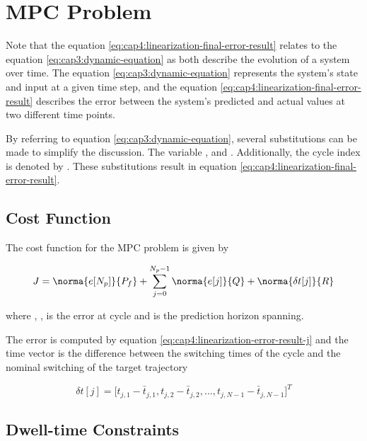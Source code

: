 \section{MPC Problem}

Note that the equation \eqref{eq:cap4:linearization-final-error-result} relates to the equation \eqref{eq:cap3:dynamic-equation} as both describe the evolution of a
system over time. The equation \eqref{eq:cap3:dynamic-equation} represents the system's state and input at a given time step,
and the equation \eqref{eq:cap4:linearization-final-error-result} describes the error between the system's predicted and actual values at two different time points.

By referring to equation \eqref{eq:cap3:dynamic-equation}, several substitutions can be made to 
simplify the discussion. The variable , and . Additionally, the cycle index is denoted by . These substitutions result 
in equation \eqref{eq:cap4:linearization-final-error-result}.
\subsection{Cost Function}

The cost function for the MPC problem is given by

\begin{equation}
\label{eq:cap4:mpc-cost-function}
    J = \norma{e[N_p]}{P_f} \\
    + \sum^{N_p - 1}_{j=0}\norma{e[j]}{Q} + \norma{\delta t[j]}{R}
\end{equation}

\noindent
where , ,  is the 
error at cycle  and  is the prediction horizon spanning.


The error  is computed by equation \eqref{eq:cap4:linearization-error-result-j} and the time vector
 is the difference between the switching times of the cycle and the nominal switching of the target trajectory  

\noindent
\begin{equation}
    \delta t[j] = \Big[t_{j,1} - \bar{t}_{j,1}, t_{j,2} - \bar{t}_{j,2}, ..., t_{j,N-1} - \bar{t}_{j,N-1}\Big]^T
\end{equation}

\subsection{Dwell-time Constraints}

